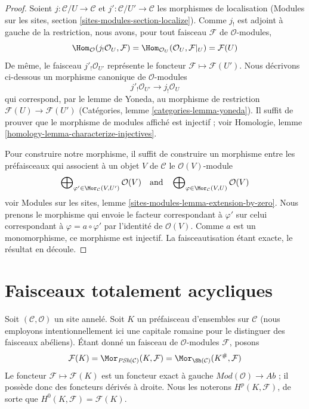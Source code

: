 \begin{proof}
Soient $j : \mathcal{C}/U \to \mathcal{C}$ et
$j' : \mathcal{C}/U' \to \mathcal{C}$ les morphismes de localisation
(Modules sur les sites, section \ref{sites-modules-section-localize}).
Comme $j_!$ est adjoint à gauche de la restriction, nous avons, pour tout
faisceau $\mathcal{F}$ de $\mathcal{O}$-modules,
$$
\Hom_\mathcal{O}(j_!\mathcal{O}_U, \mathcal{F})
=
\Hom_{\mathcal{O}_U}(\mathcal{O}_U, \mathcal{F}|_U)
=
\mathcal{F}(U)
$$
De même, le faisceau $j'_!\mathcal{O}_{U'}$ représente le foncteur
$\mathcal{F} \mapsto \mathcal{F}(U')$.
Nous décrivons ci-dessous un morphisme canonique de $\mathcal{O}$-modules
$$
j'_!\mathcal{O}_{U'} \longrightarrow j_!\mathcal{O}_U
$$
qui correspond, par le lemme de Yoneda, au morphisme de restriction
$\mathcal{F}(U) \to \mathcal{F}(U')$ (Catégories,
lemme \ref{categories-lemma-yoneda}).
Il suffit de prouver que le morphisme de modules affiché est injectif ; voir
Homologie, lemme \ref{homology-lemma-characterize-injectives}.

\medskip\noindent
Pour construire notre morphisme, il suffit de construire un morphisme entre
les préfaisceaux qui associent à un objet $V$ de $\mathcal{C}$ le
$\mathcal{O}(V)$-module
$$
\bigoplus\nolimits_{\varphi' \in \Mor_\mathcal{C}(V, U')} \mathcal{O}(V)
\quad\text{and}\quad
\bigoplus\nolimits_{\varphi \in \Mor_\mathcal{C}(V, U)} \mathcal{O}(V)
$$
voir Modules sur les sites,
lemme \ref{sites-modules-lemma-extension-by-zero}.
Nous prenons le morphisme qui envoie le facteur correspondant à $\varphi'$
sur celui correspondant à $\varphi = a \circ \varphi'$ par l'identité de
$\mathcal{O}(V)$. Comme $a$ est un monomorphisme, ce morphisme est injectif.
La faisceautisation étant exacte, le résultat en découle.
\end{proof}






\section{Faisceaux totalement acycliques}
\label{section-limp}

\noindent
Soit $(\mathcal{C}, \mathcal{O})$ un site annelé.
Soit $K$ un préfaisceau d'ensembles sur $\mathcal{C}$ (nous employons
intentionnellement ici une capitale romaine pour le distinguer des faisceaux
abéliens). Étant donné un faisceau de $\mathcal{O}$-modules $\mathcal{F}$,
posons
$$
\mathcal{F}(K) =
\Mor_{\textit{PSh}(\mathcal{C})}(K, \mathcal{F}) =
\Mor_{\Sh(\mathcal{C})}(K^\#, \mathcal{F})
$$
Le foncteur $\mathcal{F} \mapsto \mathcal{F}(K)$ est un foncteur exact à
gauche $\textit{Mod}(\mathcal{O}) \to \textit{Ab}$ ; il possède donc des
foncteurs dérivés à droite. Nous les noterons $H^p(K, \mathcal{F})$, de sorte
que $H^0(K, \mathcal{F}) = \mathcal{F}(K)$.

